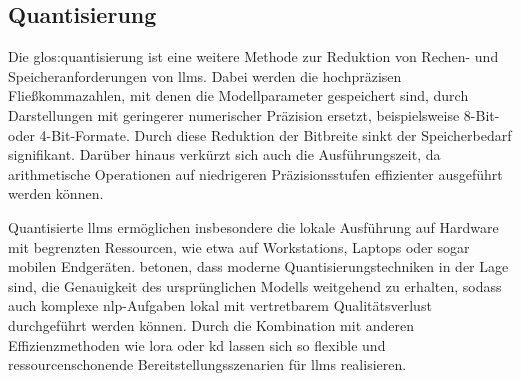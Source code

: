 
\subsection{Quantisierung}

Die \gls{glos:quantisierung} ist eine weitere Methode zur Reduktion von Rechen- und Speicheranforderungen von \glspl{llm}.
Dabei werden die hochpräzisen Fließkommazahlen, mit denen die Modellparameter gespeichert sind, durch Darstellungen mit geringerer numerischer Präzision ersetzt, beispielsweise 8-Bit- oder 4-Bit-Formate.
Durch diese Reduktion der Bitbreite sinkt der Speicherbedarf signifikant.
Darüber hinaus verkürzt sich auch die Ausführungszeit, da arithmetische Operationen auf niedrigeren Präzisionsstufen effizienter ausgeführt werden können\autocite{egashira_exploiting_2024}.

Quantisierte \glspl{llm} ermöglichen insbesondere die lokale Ausführung auf Hardware mit begrenzten Ressourcen, wie etwa auf Workstations, Laptops oder sogar mobilen Endgeräten.
\citeauthor{egashira_exploiting_2024} betonen, dass moderne Quantisierungstechniken in der Lage sind, die Genauigkeit des ursprünglichen Modells weitgehend zu erhalten, sodass auch komplexe \gls{nlp}-Aufgaben lokal mit vertretbarem Qualitätsverlust durchgeführt werden können\autocite{egashira_exploiting_2024}.
Durch die Kombination mit anderen Effizienzmethoden wie \gls{lora} oder \gls{kd} lassen sich so flexible und ressourcenschonende Bereitstellungsszenarien für \glspl{llm} realisieren.


